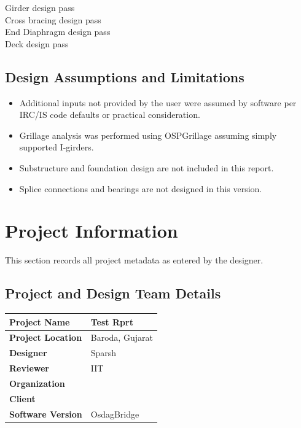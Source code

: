 \documentclass[12pt,a4paper]{report}
\numberwithin{table}{chapter}
\numberwithin{figure}{chapter}
\begin{document}
\noindent Girder design pass \\
Cross bracing design pass \\
End Diaphragm design pass \\
Deck design pass

\section*{Design Assumptions and Limitations}
\label{sec:assumptions}

\begin{itemize}
\item Additional inputs not provided by the user were assumed by software per IRC/IS code defaults or practical consideration.
\item Grillage analysis was performed using OSPGrillage assuming simply supported I-girders.
\item Substructure and foundation design are not included in this report.
\item Splice connections and bearings are not designed in this version.
\end{itemize}

\titleformat{\chapter}[block]{\normalfont\Large\bfseries\centering}{\thechapter}{1em}{}
\titlespacing*{\chapter}{0pt}{-30pt}{10pt}


\chapter{Project Information}

This section records all project metadata as entered by the designer.

\section{Project and Design Team Details}
\label{sec:project-details}

\begin{tabular}{|L{5.5cm}|L{8.5cm}|}
\hline
\textbf{Project Name} & Test Rprt \\
\hline
\textbf{Project Location} & Baroda, Gujarat \\
\hline
\textbf{Designer} & Sparsh \\
\hline
\textbf{Reviewer} & IIT \\
\hline
\textbf{Organization} &  \\
\hline
\textbf{Client} &  \\
\hline
\textbf{Software Version} & OsdagBridge \\
\hline
\end{tabular}
\end{document}
